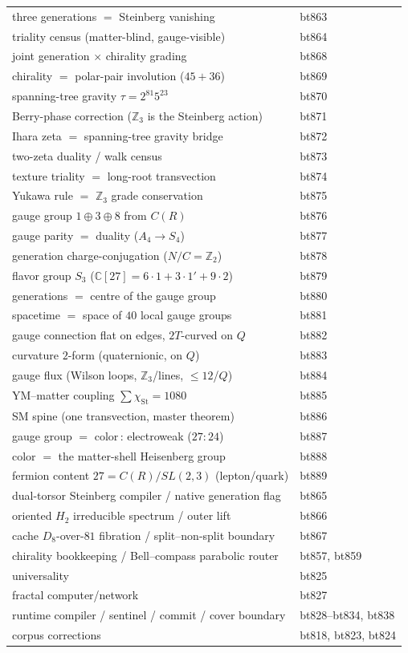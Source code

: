 \documentclass[11pt]{article}
\begin{document}
\begin{center}
\begin{tabular}{ll}
three generations $=$ Steinberg vanishing & bt863\\
triality census (matter-blind, gauge-visible) & bt864\\
joint generation $\times$ chirality grading & bt868\\
chirality $=$ polar-pair involution ($45+36$) & bt869\\
spanning-tree gravity $\tau=2^{81}5^{23}$ & bt870\\
Berry-phase correction ($\mathbb{Z}_3$ is the Steinberg action) & bt871\\
Ihara zeta $=$ spanning-tree gravity bridge & bt872\\
two-zeta duality / walk census & bt873\\
texture triality $=$ long-root transvection & bt874\\
Yukawa rule $=$ $\mathbb{Z}_3$ grade conservation & bt875\\
gauge group $1{\oplus}3{\oplus}8$ from $C(R)$ & bt876\\
gauge parity $=$ duality ($A_4{\to}S_4$) & bt877\\
generation charge-conjugation ($N/C=\mathbb{Z}_2$) & bt878\\
flavor group $S_3$ ($\mathbb{C}[27]=6{\cdot}1{+}3{\cdot}1'{+}9{\cdot}2$) & bt879\\
generations $=$ centre of the gauge group & bt880\\
spacetime $=$ space of $40$ local gauge groups & bt881\\
gauge connection flat on edges, $2T$-curved on $Q$ & bt882\\
curvature $2$-form (quaternionic, on $Q$) & bt883\\
gauge flux (Wilson loops, $\mathbb{Z}_3$/lines, ${\le}12$/$Q$) & bt884\\
YM--matter coupling $\sum\chi_{\mathrm{St}}=1080$ & bt885\\
SM spine (one transvection, master theorem) & bt886\\
gauge group $=$ color$\,{:}\,$electroweak ($27{:}24$) & bt887\\
color $=$ the matter-shell Heisenberg group & bt888\\
fermion content $27=C(R)/SL(2,3)$ (lepton/quark) & bt889\\
dual-torsor Steinberg compiler / native generation flag & bt865\\
oriented $H_2$ irreducible spectrum / outer lift & bt866\\
cache $D_8$-over-$81$ fibration / split--non-split boundary & bt867\\
chirality bookkeeping / Bell--compass parabolic router & bt857, bt859\\
universality & bt825\\
fractal computer/network & bt827\\
runtime compiler / sentinel / commit / cover boundary & bt828--bt834, bt838\\
corpus corrections & bt818, bt823, bt824\\
\bottomrule
\end{tabular}
\end{center}
\end{document}
